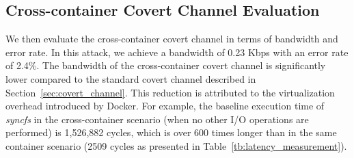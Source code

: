 \subsection{Cross-container Covert Channel Evaluation} 
We then evaluate the cross-container covert channel in terms of bandwidth and error rate. In this attack, we achieve a bandwidth of 0.23 Kbps with an error rate of 2.4\%. The bandwidth of the cross-container covert channel is significantly lower compared to the standard covert channel described in Section~\ref{sec:covert_channel}. This reduction is attributed to the virtualization overhead introduced by Docker. For example, the baseline execution time of \textit{syncfs} in the cross-container scenario (when no other I/O operations are performed) is 1,526,882 cycles, which is over 600 times longer than in the same container scenario (2509 cycles as presented in Table~\ref{tb:latency_measurement}).




